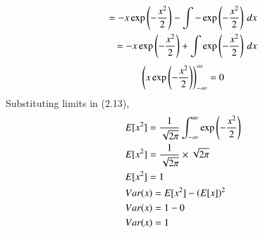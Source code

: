 \documentclass[journal,12pt,twocolumn]{IEEEtran}
\renewcommand\thesection{\arabic{section}}
\begin{document}
\begin{enumerate}[label=\thesection.\arabic*
,ref=\thesection.\theenumi]
\begin{align}
	 = -x\exp\left(-\frac{x^2}{2}\right) - \int -\exp\left(-\frac{x^2}{2}\right) \,dx \\
	 = -x\exp\left(-\frac{x^2}{2}\right) + \int \exp\left(-\frac{x^2}{2}\right) \,dx 
\end{align}
\begin{align}
\left(x\exp\left(-\frac{x^2}{2}\right)\right)_{-\infty} ^{\infty} = 0
\end{align}
Substituting limits in (2.13),
\begin{align}
	&E[x^2] = \frac{1}{\sqrt{2\pi}} \int_{-\infty}^{\infty} \exp\left(-\frac{x^2}{2}\right) \\
	&E[x^2] = \frac{1}{\sqrt{2\pi}} \times \sqrt{2\pi} \\
	&E[x^2] = 1 \\
	&Var(x) = E[x^2] - \left(E[x]\right)^2 \\
	&Var(x) = 1 - 0 \\
	&Var(x) = 1
\end{align}
\end{enumerate}
\end{document}
